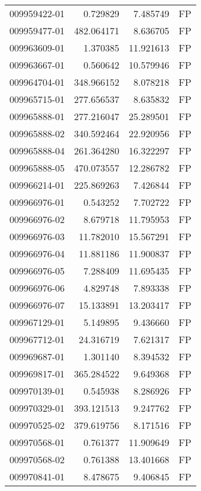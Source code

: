 \begin{tabular}{lrrl}
009959422-01 &    0.729829 &       7.485749 &   FP \\
009959477-01 &  482.064171 &       8.636705 &   FP \\
009963609-01 &    1.370385 &      11.921613 &   FP \\
009963667-01 &    0.560642 &      10.579946 &   FP \\
009964704-01 &  348.966152 &       8.078218 &   FP \\
009965715-01 &  277.656537 &       8.635832 &   FP \\
009965888-01 &  277.216047 &      25.289501 &   FP \\
009965888-02 &  340.592464 &      22.920956 &   FP \\
009965888-04 &  261.364280 &      16.322297 &   FP \\
009965888-05 &  470.073557 &      12.286782 &   FP \\
009966214-01 &  225.869263 &       7.426844 &   FP \\
009966976-01 &    0.543252 &       7.702722 &   FP \\
009966976-02 &    8.679718 &      11.795953 &   FP \\
009966976-03 &   11.782010 &      15.567291 &   FP \\
009966976-04 &   11.881186 &      11.900837 &   FP \\
009966976-05 &    7.288409 &      11.695435 &   FP \\
009966976-06 &    4.829748 &       7.893338 &   FP \\
009966976-07 &   15.133891 &      13.203417 &   FP \\
009967129-01 &    5.149895 &       9.436660 &   FP \\
009967712-01 &   24.316719 &       7.621317 &   FP \\
009969687-01 &    1.301140 &       8.394532 &   FP \\
009969817-01 &  365.284522 &       9.649368 &   FP \\
009970139-01 &    0.545938 &       8.286926 &   FP \\
009970329-01 &  393.121513 &       9.247762 &   FP \\
009970525-02 &  379.619756 &       8.171516 &   FP \\
009970568-01 &    0.761377 &      11.909649 &   FP \\
009970568-02 &    0.761388 &      13.401668 &   FP \\
009970841-01 &    8.478675 &       9.406845 &   FP \\

\end{tabular}
